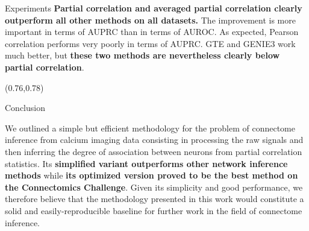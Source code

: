 \documentclass[final]{beamer}
\begin{document}
\begin{frame}{}
\begin{textblock}{0.74}
\begin{block}{Experiments \phantom{p}}
\textbf{Partial correlation and averaged partial correlation clearly outperform all other methods on all datasets.} The
improvement is more important in terms of AUPRC than in terms of AUROC. As
expected, Pearson correlation performs very poorly in terms of AUPRC. GTE and
GENIE3 work much better, but \textbf{these two methods are nevertheless clearly below
partial correlation}.

\end{block}

\end{textblock}




\begin{textblock}{0.22}(0.76,0.78)

\begin{block}{Conclusion \phantom{p}}
\vspace{-0.4cm}
\begin{center}

\begin{minipage}{0.95\linewidth}
\begin{shaded}

We outlined a simple but efficient methodology for the problem
of connectome inference from calcium imaging data consisting in processing the raw signals and then inferring the degree of association between neurons from partial correlation statistics. 
Its \textbf{simplified variant outperforms other
network inference methods} while \textbf{its optimized version proved to be the best method
on the Connectomics Challenge}.
Given its simplicity and good performance, we
therefore believe that the methodology presented in this work
would constitute a solid and easily-reproducible baseline for further work in
the field of connectome inference.



\end{shaded}
\end{minipage}
\end{center}

\vspace{-1cm}

\end{block}

\end{textblock}


\end{frame}
\end{document}
